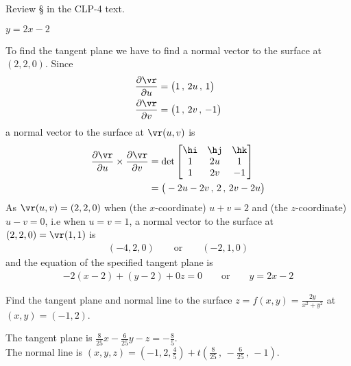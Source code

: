 \begin{hint} 
Review \S{} in the CLP-4 text.
\end{hint}

\begin{answer} 
        $y=2x-2$
\end{answer}

\begin{solution} 
To find the tangent plane we have to find a normal vector 
to the surface at $(2,2,0)$. Since
\begin{align*}
\frac{\partial\vr}{\partial u}
&=\big(1\,,\,
       2u\,,\,
        1 \big) \\
\frac{\partial\vr}{\partial v}
&=\big(1\,,\,
       2v\,,\,
       -1 \big) 
\end{align*}
a normal vector to the surface at $\vr(u,v)$ is
\begin{align*}
\frac{\partial\vr}{\partial u} \times \frac{\partial\vr}{\partial v} 
&=\det\left[\begin{matrix}
                      \hi & \hj & \hk \\
                      1   & 2u  &  1  \\
                      1   & 2v  & -1 \end{matrix} \right] \\ 
&=\big(-2u-2v\,,\,
       2\,,\,
       2v-2u\big)
\end{align*}
As $\vr(u,v) = (2,2,0)$ when (the $x$-coordinate) $u+v=2$ and 
(the $z$-coordinate) $u-v=0$, i.e when $u=v=1$,
a normal vector to the surface at $(2,2,0)=\vr(1,1)$ is
\begin{align*}
(-4,2,0)\qquad\text{or}\qquad (-2,1,0)
\end{align*}
and the equation of the specified tangent plane is
\begin{align*}
-2(x-2) +(y-2) +0z= 0\qquad\text{or} \qquad y=2x-2
\end{align*}
\end{solution}

\begin{question}[M200 2010D] %
Find the tangent plane and normal line to the surface 
$z=f(x,y)=\frac{2y}{x^2+y^2}$ at $(x,y)=(-1,2)$.
\end{question}

%

\begin{answer}
The tangent plane is $\frac{8}{25}x-\frac{6}{25}y-z=-\frac{8}{5}$.\\ 
  \null\hskip0.3in   The normal line is 
   $( x,y,z) = ( -1,2,\frac{4}{5}) 
                  +t ( \frac{8}{25}\,,\,-\frac{6}{25}\,,\,-1)$.
\end{answer}

